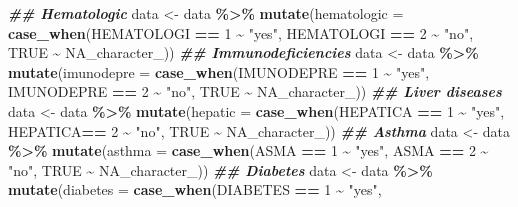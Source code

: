\documentclass[
]{article}
\newenvironment{Shaded}{\begin{snugshade}}{\end{snugshade}}
\newcommand{\AttributeTok}[1]{\textcolor[rgb]{0.13,0.29,0.53}{#1}}
\newcommand{\ConstantTok}[1]{\textcolor[rgb]{0.56,0.35,0.01}{#1}}
\newcommand{\DecValTok}[1]{\textcolor[rgb]{0.00,0.00,0.81}{#1}}
\newcommand{\DocumentationTok}[1]{\textcolor[rgb]{0.56,0.35,0.01}{\textbf{\textit{#1}}}}
\newcommand{\FunctionTok}[1]{\textcolor[rgb]{0.13,0.29,0.53}{\textbf{#1}}}
\newcommand{\NormalTok}[1]{#1}
\newcommand{\OtherTok}[1]{\textcolor[rgb]{0.56,0.35,0.01}{#1}}
\newcommand{\SpecialCharTok}[1]{\textcolor[rgb]{0.81,0.36,0.00}{\textbf{#1}}}
\newcommand{\StringTok}[1]{\textcolor[rgb]{0.31,0.60,0.02}{#1}}
\begin{document}
\begin{Shaded}
\begin{Highlighting}[]
\DocumentationTok{\#\# Hematologic}
\NormalTok{data }\OtherTok{\textless{}{-}}\NormalTok{  data }\SpecialCharTok{\%\textgreater{}\%}
\FunctionTok{mutate}\NormalTok{(}\AttributeTok{hematologic =} \FunctionTok{case\_when}\NormalTok{(HEMATOLOGI }\SpecialCharTok{==} \DecValTok{1} \SpecialCharTok{\textasciitilde{}} \StringTok{"yes"}\NormalTok{,}
\NormalTok{                              HEMATOLOGI }\SpecialCharTok{==} \DecValTok{2} \SpecialCharTok{\textasciitilde{}} \StringTok{"no"}\NormalTok{, }
                              \ConstantTok{TRUE} \SpecialCharTok{\textasciitilde{}} \ConstantTok{NA\_character\_}\NormalTok{))}
\DocumentationTok{\#\# Immunodeficiencies}
\NormalTok{data }\OtherTok{\textless{}{-}}\NormalTok{  data }\SpecialCharTok{\%\textgreater{}\%}
\FunctionTok{mutate}\NormalTok{(}\AttributeTok{imunodepre =} \FunctionTok{case\_when}\NormalTok{(IMUNODEPRE }\SpecialCharTok{==} \DecValTok{1} \SpecialCharTok{\textasciitilde{}} \StringTok{"yes"}\NormalTok{,}
\NormalTok{                              IMUNODEPRE }\SpecialCharTok{==} \DecValTok{2} \SpecialCharTok{\textasciitilde{}} \StringTok{"no"}\NormalTok{, }
                              \ConstantTok{TRUE} \SpecialCharTok{\textasciitilde{}} \ConstantTok{NA\_character\_}\NormalTok{))}
\DocumentationTok{\#\# Liver diseases}
\NormalTok{data }\OtherTok{\textless{}{-}}\NormalTok{  data }\SpecialCharTok{\%\textgreater{}\%}
\FunctionTok{mutate}\NormalTok{(}\AttributeTok{hepatic =} \FunctionTok{case\_when}\NormalTok{(HEPATICA }\SpecialCharTok{==} \DecValTok{1} \SpecialCharTok{\textasciitilde{}} \StringTok{"yes"}\NormalTok{,}
\NormalTok{                            HEPATICA}\SpecialCharTok{==} \DecValTok{2} \SpecialCharTok{\textasciitilde{}} \StringTok{"no"}\NormalTok{, }
                            \ConstantTok{TRUE} \SpecialCharTok{\textasciitilde{}} \ConstantTok{NA\_character\_}\NormalTok{))}
\DocumentationTok{\#\# Asthma}
\NormalTok{data }\OtherTok{\textless{}{-}}\NormalTok{  data }\SpecialCharTok{\%\textgreater{}\%}
\FunctionTok{mutate}\NormalTok{(}\AttributeTok{asthma =} \FunctionTok{case\_when}\NormalTok{(ASMA }\SpecialCharTok{==} \DecValTok{1} \SpecialCharTok{\textasciitilde{}} \StringTok{"yes"}\NormalTok{,}
\NormalTok{                        ASMA }\SpecialCharTok{==} \DecValTok{2} \SpecialCharTok{\textasciitilde{}} \StringTok{"no"}\NormalTok{, }
                        \ConstantTok{TRUE} \SpecialCharTok{\textasciitilde{}} \ConstantTok{NA\_character\_}\NormalTok{))}
\DocumentationTok{\#\# Diabetes}
\NormalTok{data }\OtherTok{\textless{}{-}}\NormalTok{  data }\SpecialCharTok{\%\textgreater{}\%}
\FunctionTok{mutate}\NormalTok{(}\AttributeTok{diabetes =} \FunctionTok{case\_when}\NormalTok{(DIABETES }\SpecialCharTok{==} \DecValTok{1} \SpecialCharTok{\textasciitilde{}} \StringTok{"yes"}\NormalTok{,}

\end{Highlighting}
\end{Shaded}
\end{document}
